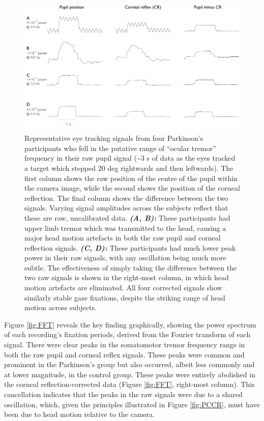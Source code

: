 \documentclass[jou,a4paper]{apa6}
\begin{document}
\begin{figure}[htbp]
\begin{center}
\includegraphics {Figures/Figure_2_Individual_traces}
\caption{Representative eye tracking signals from four Parkinson's participants who fell in the putative range of ``ocular tremor'' frequency in their raw pupil signal (\textasciitilde{}3 s of data as the eyes tracked a target which stepped 20 deg rightwards and then leftwards). The first column shows the raw position of the centre of the pupil within the camera image, while the second shows the position of the corneal reflection. The final column shows the difference between the two signals. Varying signal amplitudes across the subjects reflect that these are raw, uncalibrated data. \textbf{\textit{(A, B):}} These participants had upper limb tremor which was transmitted to the head, causing a major head motion artefacts in both the raw pupil and corneal reflection signals. \textbf{\textit{(C, D):}} These participants had much lower peak power in their raw signals, with any oscillation being much more subtle.
The effectiveness of simply taking the difference between the two raw signals is shown in the right-most column, in which head motion artefacts are eliminated. All four corrected signals show similarly stable gaze fixations, despite the striking range of head motion across subjects.
}
\label{fig:traces}
\end{center}
\end{figure}

Figure \ref{fig:FFT} reveals the key finding graphically, showing the power spectrum of each recording's fixation periods, derived from the Fourier transform of each signal. There were clear peaks in the somatomotor tremor frequency range in both the raw pupil and corneal reflex signals. These peaks were common and prominent in the Parkinson's group but also occurred, albeit less commonly and at lower magnitude, in the control group. These peaks were entirely abolished in the corneal reflection-corrected data (Figure \ref{fig:FFT}, right-most column). This cancellation indicates that the peaks in the raw signals were due to a shared oscillation, which, given the principles illustrated in Figure \ref{fig:PCCR}, must have been due to head motion relative to the camera.
\end{document}
